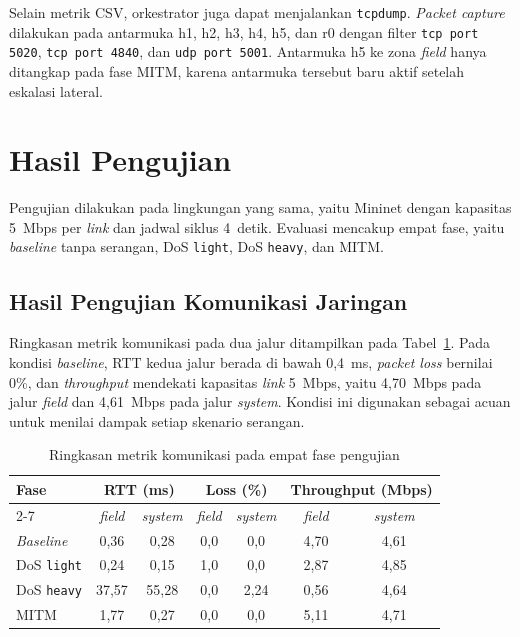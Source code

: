 Selain metrik CSV, orkestrator juga dapat menjalankan \texttt{tcpdump}. \textit{Packet capture} dilakukan pada antarmuka h1, h2, h3, h4, h5, dan r0 dengan filter \texttt{tcp port 5020}, \texttt{tcp port 4840}, dan \texttt{udp port 5001}. Antarmuka h5 ke zona \textit{field} hanya ditangkap pada fase \ac{MITM}, karena antarmuka tersebut baru aktif setelah eskalasi lateral.

\section{Hasil Pengujian}
\label{sec:hasil_pengujian}
Pengujian dilakukan pada lingkungan yang sama, yaitu Mininet dengan kapasitas 5~Mbps per \textit{link} dan jadwal siklus 4~detik. Evaluasi mencakup empat fase, yaitu \textit{baseline} tanpa serangan, \ac{DoS} \texttt{light}, \ac{DoS} \texttt{heavy}, dan \ac{MITM}.

\subsection{Hasil Pengujian Komunikasi Jaringan}
\label{subsec:hasil_pengujian_komunikasi_jaringan}
Ringkasan metrik komunikasi pada dua jalur ditampilkan pada Tabel~\ref{tab:hasil_komunikasi}. Pada kondisi \textit{baseline}, RTT kedua jalur berada di bawah 0{,}4~ms, \textit{packet loss} bernilai 0\%, dan \textit{throughput} mendekati kapasitas \textit{link} 5~Mbps, yaitu 4{,}70~Mbps pada jalur \textit{field} dan 4{,}61~Mbps pada jalur \textit{system}. Kondisi ini digunakan sebagai acuan untuk menilai dampak setiap skenario serangan.

\renewcommand{\arraystretch}{1.3}
\begin{table}[htbp]
    \centering
    \caption{Ringkasan metrik komunikasi pada empat fase pengujian}
    \label{tab:hasil_komunikasi}
    \begin{tabular}{|l|c|c|c|c|c|c|}
        \hline
        \multirow{2}{*}{\textbf{Fase}} & \multicolumn{2}{c|}{\textbf{RTT (ms)}} & \multicolumn{2}{c|}{\textbf{Loss (\%)}} & \multicolumn{2}{c|}{\textbf{Throughput (Mbps)}} \\ \cline{2-7}
         & \textit{field} & \textit{system} & \textit{field} & \textit{system} & \textit{field} & \textit{system} \\ \hline
        \textit{Baseline}     & 0{,}36  & 0{,}28  & 0{,}0  & 0{,}0  & 4{,}70 & 4{,}61 \\ \hline
        \ac{DoS} \texttt{light} & 0{,}24  & 0{,}15  & 1{,}0  & 0{,}0  & 2{,}87 & 4{,}85 \\ \hline
        \ac{DoS} \texttt{heavy} & 37{,}57 & 55{,}28 & 0{,}0  & 2{,}24 & 0{,}56 & 4{,}64 \\ \hline
        \ac{MITM}             & 1{,}77  & 0{,}27  & 0{,}0  & 0{,}0  & 5{,}11 & 4{,}71 \\ \hline
    \end{tabular}
\end{table}

